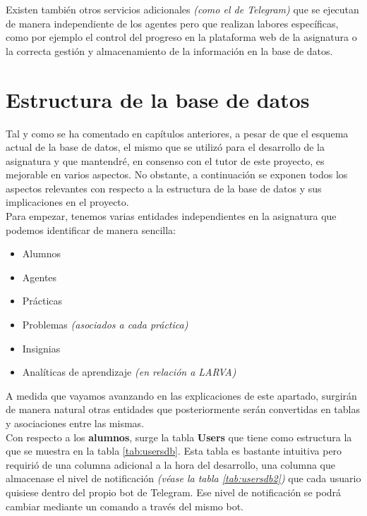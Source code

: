 Existen también otros servicios adicionales \textit{(como el de Telegram)} que se ejecutan de manera independiente de los agentes pero que realizan labores específicas, como por ejemplo el control del progreso en la plataforma web de la asignatura o la correcta gestión y almacenamiento de la información en la base de datos.

\section{Estructura de la base de datos}

Tal y como se ha comentado en capítulos anteriores, a pesar de que el esquema actual de la base de datos, el mismo que se utilizó para el desarrollo de la asignatura y que mantendré, en consenso con el tutor de este proyecto, es mejorable en varios aspectos. No obstante, a continuación se exponen todos los aspectos relevantes con respecto a la estructura de la base de datos y sus implicaciones en el proyecto.\\

Para empezar, tenemos varias entidades independientes en la asignatura que podemos identificar de manera sencilla:

\begin{itemize}
    \item Alumnos
    \item Agentes
    \item Prácticas
    \item Problemas \textit{(asociados a cada práctica)}
    \item Insignias
    \item Analíticas de aprendizaje \textit{(en relación a LARVA)}
\end{itemize}

A medida que vayamos avanzando en las explicaciones de este apartado, surgirán de manera natural otras entidades que posteriormente serán convertidas en tablas y asociaciones entre las mismas.\\

Con respecto a los \textbf{alumnos}, surge la tabla \textbf{Users} que tiene como estructura la que se muestra en la tabla \ref{tab:usersdb}. Esta tabla es bastante intuitiva pero requirió de una columna adicional a la hora del desarrollo, una columna que almacenase el nivel de notificación \textit{(véase la tabla \ref{tab:usersdb2})} que cada usuario quisiese dentro del propio bot de Telegram. Ese nivel de notificación se podrá cambiar mediante un comando a través del mismo bot.

